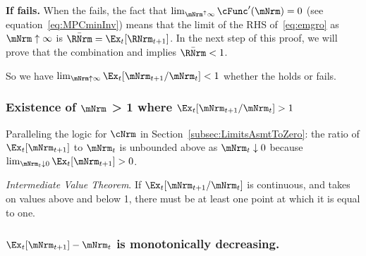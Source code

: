 \documentclass[\econtexRoot/BufferStockTheory]{subfiles}
\begin{document}
\textbf{If {\RIC} fails.}  When the {\RIC} fails, the fact that $\lim_{\mNrm^{\uparrow} \infty} \cFunc^{\prime}(\mNrm) = 0$ (see equation~\eqref{eq:MPCminInv}) means that the limit of the RHS of~\eqref{eq:emgro} as $\mNrm \uparrow \infty$ is $\bar{\RNrm}=\Ex_{t}[\RNrm_{t+1}]$.  In the next step of this proof, we will prove that the combination {\GICMod} and \cncl{\RIC} implies $\bar{\RNrm} < 1$.

So we have $\lim_{\mNrm \uparrow \infty} \Ex_{t}[\mNrm_{t+1}/\mNrm_{t}] < 1$ whether the {\RIC} holds or fails.

\medskip

\subsubsection{Existence of \texorpdfstring{$\mNrm$}{m} > 1 where \texorpdfstring{$\Ex_t [{\mNrm}_{t+1}/\mNrm_t] > 1$}{E[m{t+1}/m{t}] > 1}}
Paralleling the logic for $\cNrm$ in Section~\ref{subsec:LimitsAsmtToZero}: the ratio of $\Ex_{t}[\mNrm_{t+1}]$ to $\mNrm_{t}$ is unbounded above as $\mNrm_{t} \downarrow 0$ because $\lim_{\mNrm_{t}\downarrow 0} \Ex_{t}[\mNrm_{t+1}] > 0$.

\medskip\medskip

\noindent \textit{Intermediate Value Theorem}.  If $\Ex_t [{\mNrm}_{t+1}/\mNrm_t]$ is continuous, and takes on values above and below 1, there must be at least one point at which it is equal to one.

\subsubsection{\texorpdfstring{$\Ex_t [{\mNrm}_{t+1}] -\mNrm_t$}{Delta m} is monotonically decreasing.}
\end{document}
